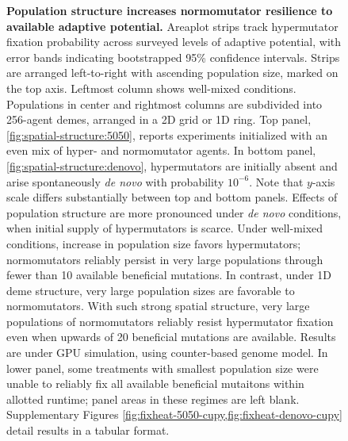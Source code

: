 \begin{figure}[h]
  \begin{minipage}{\textwidth}
    \caption{%
      \textbf{Population structure increases normomutator resilience to available adaptive potential.}
      \footnotesize
      Areaplot strips track hypermutator fixation probability across surveyed levels of adaptive potential, with error bands indicating bootstrapped 95\% confidence intervals.
      Strips are arranged left-to-right with ascending population size, marked on the top axis.
      Leftmost column shows well-mixed conditions.
      Populations in center and rightmost columns are subdivided into 256-agent demes, arranged in a 2D grid or 1D ring.
      Top panel, \ref{fig:spatial-structure:5050}, reports experiments initialized with an even mix of hyper- and normomutator agents.
      In bottom panel, \ref{fig:spatial-structure:denovo}, hypermutators are initially absent and arise spontaneously \textit{de novo} with probability $10^{-6}$.
      Note that $y$-axis scale differs substantially between top and bottom panels.
      Effects of population structure are more pronounced under \textit{de novo} conditions, when initial supply of hypermutators is scarce.
      Under well-mixed conditions, increase in population size favors hypermutators; normomutators reliably persist in very large populations through fewer than 10 available beneficial mutations.
      In contrast, under 1D deme structure, very large population sizes are favorable to normomutators.
      With such strong spatial structure, very large populations of normomutators reliably resist hypermutator fixation even when upwards of 20 beneficial mutations are available.
      Results are under GPU simulation, using counter-based genome model.
      In lower panel, some treatments with smallest population size were unable to reliably fix all available beneficial mutaitons within allotted runtime; panel areas in these regimes are left blank.
      Supplementary Figures \cref{fig:fixheat-5050-cupy,fig:fixheat-denovo-cupy} detail results in a tabular format.
    }
    \label{fig:spatial-structure}
  \end{minipage}
\end{figure}
